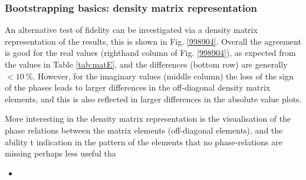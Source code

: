 \subsubsection{Bootstrapping basics: density matrix representation}

An alternative test of fidelity can be investigated via a density matrix representation of the results, this is shown in Fig. \ref{998904}. Overall the agreement is good for the real values (righthand column of Fig. \ref{998904}), as expected from the values in Table \ref{tab:matE}, and the differences (bottom row) are generally $<10~\%$. However, for the imaginary values (middle column) the loss of the sign of the phases leads to larger differences in the off-diagonal density matrix elements, and this is also reflected in larger differences in the absolute value plots.

More interesting in the density matrix representation is the visualisation of the phase relations between the matrix elements (off-diagonal elements), and the ability t indication in the pattern of the elements that no phase-relations are missing
perhaps less useful tha

\begin{itemize}
\item 
\end{itemize}
